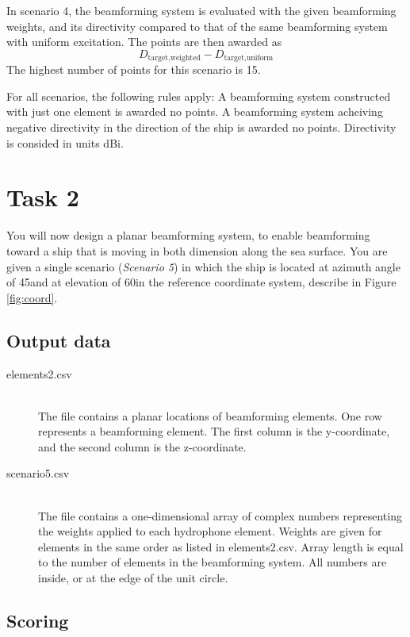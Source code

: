 \documentclass{article}[a4paper]
\begin{document}
In scenario 4, the beamforming system is evaluated with the given beamforming weights, and its directivity compared to that of the same beamforming system with uniform excitation. The points are then awarded as
\[ D_\textrm{target,weighted} - D_\textrm{target,uniform} \]
The highest number of points for this scenario is 15.

For all scenarios, the following rules apply: A beamforming system constructed with just one element is awarded no points. A beamforming system acheiving negative directivity in the direction of the ship is awarded no points. Directivity is consided in units dBi.

\section{Task 2}

You will now design a planar beamforming system, to enable beamforming toward a ship that is moving in both dimension along the sea surface. You are given a single scenario (\textit{Scenario 5}) in which the ship is located at azimuth angle of 45\textdegree and at elevation of 60\textdegree in the reference coordinate system, describe in Figure \ref{fig:coord}.

\subsection{Output data}

\begin{description}
	\item[elements2.csv] \,\\ The file contains a planar locations of beamforming elements. One row represents a beamforming element. The first column is the y-coordinate, and the second column is the z-coordinate.
	\item[scenario5.csv] \,\\ The file contains a one-dimensional array of complex numbers representing the weights applied to each hydrophone element. Weights are given for elements in the same order as listed in elements2.csv. Array length is equal to the number of elements in the beamforming system. All numbers are inside, or at the edge of the unit circle.
\end{description}

\subsection*{Scoring}
\end{document}
